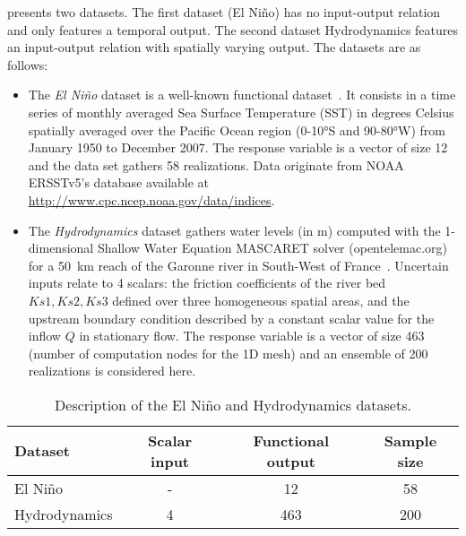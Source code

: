  presents two datasets. The first dataset (El Ni\~no) has no input-output relation and only features a temporal output. The second dataset Hydrodynamics features an input-output relation with spatially varying output. The datasets are as follows:
\begin{itemize}
\item The \emph{El Ni\~{n}o} dataset is a well-known functional dataset~\citep{Hyndman2009}. It consists in a time series of monthly averaged Sea Surface Temperature (SST) in degrees Celsius spatially averaged over the Pacific Ocean region (0-10°S and 90-80°W) from January 1950 to December 2007. The response variable is a vector of size 12 and the data set gathers 58 realizations. Data originate from NOAA ERSSTv5's database available at \href{http://www.cpc.ncep.noaa.gov/data/indices}{http://www.cpc.ncep.noaa.gov/data/indices}.
\item The \emph{Hydrodynamics} dataset gathers water levels (in m) computed with the 1-dimensional Shallow Water Equation MASCARET solver (opentelemac.org) for a 50~km reach of the Garonne river in South-West of France~\citep{Roy2017}. Uncertain inputs relate to 4 scalars: the friction coefficients of the river bed $Ks1, Ks2, Ks3$ defined over three homogeneous spatial areas, and the upstream boundary condition described by a constant scalar value for the inflow $Q$ in stationary flow. The response variable is a vector of size 463 (number of computation nodes for the 1D mesh) and an ensemble of 200 realizations is considered here. 
\end{itemize}

\begin{table}[!h]
\centering
\begin{tabular}{lccc}
\toprule
Dataset & Scalar input & Functional output & Sample size\\
\midrule %
El Ni\~no & - & 12 & 58\\
Hydrodynamics & 4 & 463 & 200\\
\bottomrule
\end{tabular}
\caption{Description of the El Ni\~no and Hydrodynamics datasets.}
\label{tab:dataset}
\end{table}

